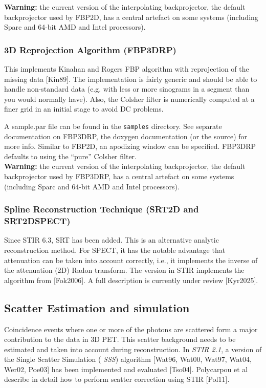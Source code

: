 \documentclass{article}
\begin{document}
\textbf{Warning:} the current version of the interpolating backprojector, 
the default backprojector used by FBP2D, has a central artefact 
on some systems (including Sparc and 64-bit AMD and Intel processors). 


\subsubsection{
3D Reprojection Algorithm (FBP3DRP)}

This implements Kinahan and Rogers FBP algorithm with reprojection 
of the missing data [Kin89]. The implementation is fairly generic 
and should be able to handle non-standard data (e.g. with less 
or more sinograms in a segment than you would normally have). 
Also, the Colsher filter is numerically computed at a finer grid 
in an initial stage to avoid DC problems.


A sample.par file can be found in the \texttt{samples} directory. See separate documentation on FBP3DRP, the doxygen documentation 
(or the source) for more info. Similar to FBP2D, an apodizing window can be specified.
FBP3DRP defaults to using the ``pure'' Colsher filter. \\
\textbf{Warning:} the current version of the interpolating backprojector, 
the default backprojector used by FBP3DRP, has a central artefact 
on some systems (including Sparc and 64-bit AMD and Intel processors).

\subsubsection{
Spline Reconstruction Technique (SRT2D and SRT2DSPECT)}

Since STIR 6.3, SRT has been added. This is an alternative analytic reconstruction method.
For SPECT, it has the notable advantage that attenuation can be taken into account correctly,
i.e., it implements the inverse of the attenuation (2D) Radon transform.
The version in STIR implements the algorithm from [Fok2006]. A full description is currently
under review [Kyr2025].

\subsection{
Scatter Estimation and simulation}
\label{sec:scatterestimation}
Coincidence events where one or more of the photons are scattered form a major contribution to the data
in 3D PET. This scatter background needs to be estimated and taken into account during reconstruction. In
\textit{STIR 2.1}, a version of the Single Scatter Simulation ( \textit{SSS}) algorithm [Wat96, Wat00,
Wat97, Wat04, Wer02, Poe03] has been implemented and evaluated [Tso04].
Polycarpou et al describe in detail how to perform scatter correction
using STIR [Pol11].
\end{document}
